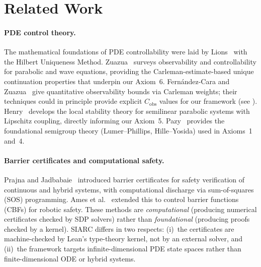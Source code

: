 \documentclass[11pt,a4paper]{article}
\theoremstyle{plain}
\theoremstyle{definition}
\theoremstyle{remark}
\begin{document}
\section{Related Work}\label{sec:related}

\paragraph{PDE control theory.}
The mathematical foundations of PDE controllability were laid by
Lions~\cite{Lions1988} with the Hilbert Uniqueness Method.
Zuazua~\cite{Zuazua2007} surveys observability and controllability for
parabolic and wave equations, providing the Carleman-estimate-based unique
continuation properties that underpin our Axiom~6.
Fern\'{a}ndez-Cara and Zuazua~\cite{FernandezCara2000} give quantitative
observability bounds via Carleman weights; their techniques could in
principle provide explicit $C_{\mathrm{obs}}$ values for our framework
(see ).
Henry~\cite{Henry1981} develops the local stability theory for semilinear
parabolic systems with Lipschitz coupling, directly informing our
Axiom~5.  Pazy~\cite{Pazy1983} provides the foundational semigroup theory
(Lumer--Phillips, Hille--Yosida) used in Axioms~1 and~4.

\paragraph{Barrier certificates and computational safety.}
Prajna and Jadbabaie~\cite{PrajnaBarrier} introduced barrier certificates
for safety verification of continuous and hybrid systems, with
computational discharge via sum-of-squares (SOS) programming.
Ames et al.~\cite{AmesSOS} extended this to control barrier functions
(CBFs) for robotic safety.  These methods are \emph{computational}
(producing numerical certificates checked by SDP solvers) rather than
\emph{foundational} (producing proofs checked by a kernel).
SIARC differs in two respects: (i)~the certificates are machine-checked
by Lean's type-theory kernel, not by an external solver, and (ii)~the
framework targets infinite-dimensional PDE state spaces rather than
finite-dimensional ODE or hybrid systems.
\end{document}
